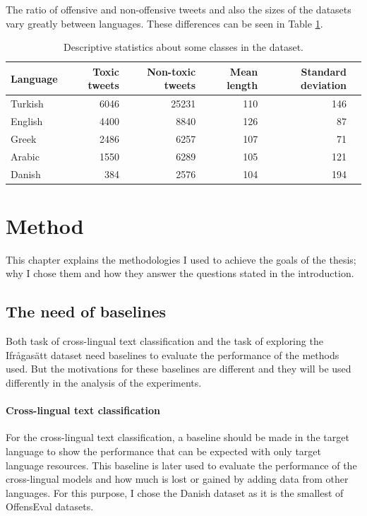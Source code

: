 \documentclass[nofilelist]{cslthse-msc}
\begin{document}
The ratio of offensive and non-offensive tweets and also the sizes of the datasets vary greatly between languages. These differences can be seen in Table \ref{tab:deskriptivOffensEval}.

\begin{table}[t]
\centering
\begin{tabular}{@{}lrrrrr@{}}
\toprule
Language    & Toxic tweets & Non-toxic tweets & Mean length & Standard deviation \\ \midrule
Turkish      & 6046 & 25231  & 110                & 146    \\
English & 4400 & 8840  & 126                & 87   \\
Greek   & 2486 & 6257 & 107 & 71  \\
Arabic       & 1550 & 6289  & 105                & 121     \\ 
Danish & 384 & 2576 & 104 & 194 \\\bottomrule
\end{tabular}
\caption{Descriptive statistics about some classes in the dataset.}
\label{tab:deskriptivOffensEval}
\end{table}

\chapter{Method}

This chapter explains the methodologies I used to achieve the goals of the thesis; why I chose them and how they answer the questions stated in the introduction.

\section{The need of baselines}

Both task of cross-lingual text classification and the task of exploring the Ifrågasätt dataset need baselines to evaluate the performance of the methods used. But the motivations for these baselines are different and they will be used differently in the analysis of the experiments.

\subsubsection{Cross-lingual text classification}
For the cross-lingual text classification, a baseline should be made in the target language to show the performance that can be expected with only target language resources. This baseline is later used to evaluate the performance of the cross-lingual models and how much is lost or gained by adding data from other languages. For this purpose, I chose the Danish dataset as it is the smallest of OffensEval datasets.
\end{document}
